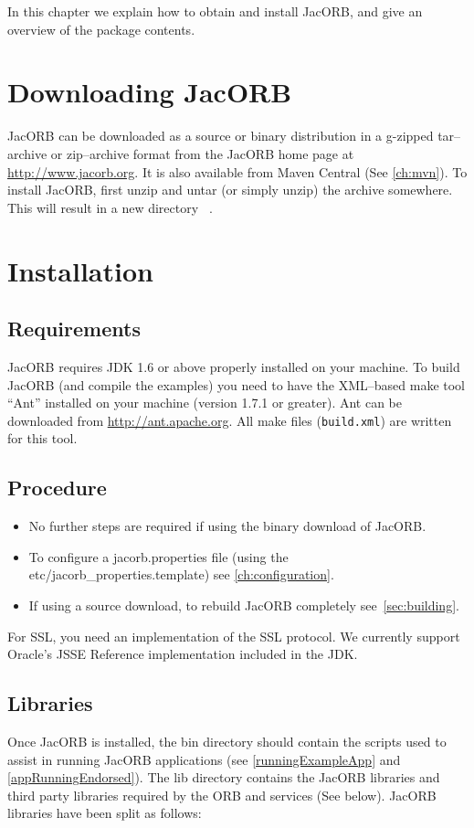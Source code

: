 
In this chapter  we explain how to obtain and  install JacORB, and give
an overview of the package contents.

\section{Downloading JacORB}

JacORB can be downloaded as a source or binary distribution in a g-zipped
tar--archive or zip--archive format from the JacORB home page at
\href{http://www.jacorb.org}{http://www.jacorb.org}. It is also available from
Maven Central (See \ref{ch:mvn}). To install JacORB, first unzip and untar (or
simply unzip) the archive somewhere.  This will result in a new directory {\tt
\JacORBDir}.

\section{Installation}
\label{Sec_installation}

\subsection{Requirements}

JacORB requires JDK 1.6 or above properly installed on your machine.  To build
JacORB (and compile the examples) you need to have the XML--based make tool
``Ant'' installed on your machine (version 1.7.1 or greater).  Ant can be downloaded
from \href{http://ant.apache.org}{http://ant.apache.org}. All make
files ({\tt build.xml}) are written for this tool.

\subsection{Procedure}
\begin{itemize}
\item No further steps are required if using the binary download of JacORB.
\item To configure a jacorb.properties file (using the etc/jacorb\_properties.template) see \ref{ch:configuration}.
\item If using a source download, to rebuild JacORB completely see~\ref{sec:building}.
\end{itemize}

For SSL, you need an implementation of the SSL protocol. We currently support
Oracle's JSSE Reference implementation included in the JDK.

\subsection{Libraries}
Once JacORB is installed, the bin directory should contain the scripts used to assist in
running JacORB applications (see \ref{runningExampleApp} and \ref{appRunningEndorsed}).
The lib directory contains the JacORB libraries and third party libraries required by the ORB
and services (See below). JacORB libraries have been split as follows:

